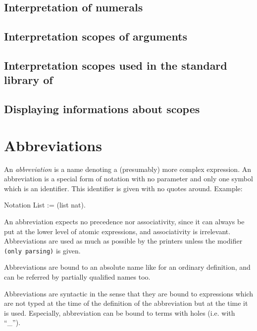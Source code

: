 
\subsection{Interpretation of numerals}

\subsection{Interpretation scopes of arguments}

\subsection{Interpretation scopes used in the standard library of {\Coq}}


\subsection{Displaying informations about scopes}


\section{Abbreviations}
\label{Abbreviations}

An {\em abbreviation} is a name denoting a (presumably) more complex
expression. An abbreviation is a special form of notation with no
parameter and only one symbol which is an identifier. This identifier
is given with no quotes around. Example:

\begin{coq_example*}
Notation List := (list nat).
\end{coq_example*}

An abbreviation expects no precedence nor associativity, since it can
always be put at the lower level of atomic expressions, and
associativity is irrelevant. Abbreviations are used as much as
possible by the {\Coq} printers unless the modifier
\verb=(only parsing)= is given.

Abbreviations are bound to an absolute name like for an ordinary
definition, and can be referred by partially qualified names too.

Abbreviations are syntactic in the sense that they are bound to
expressions which are not typed at the time of the definition of the
abbreviation but at the time it is used. Especially, abbreviation can
be bound to terms with holes (i.e. with ``\_'').


